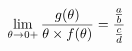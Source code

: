 \documentclass[preview]{standalone}
\begin{document}
\begin{align*}
\lim_{\theta \to 0 +} {g( \theta ) \over {\theta \times f( \theta )}} = \cfrac{\frac{a}{b}}{\frac{c}{d}}
\end{align*}
\end{document}
